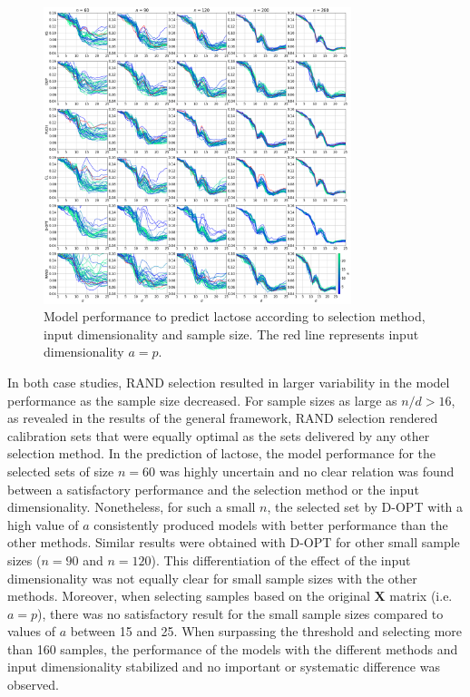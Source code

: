 \documentclass[journal=ancham,manuscript=article]{achemso}
\begin{document}
\begin{figure}[b]
\includegraphics[width=0.8\textwidth]{manuscript/figures/d01_milk_model_performance.png}
\centering
\caption{Model performance to predict lactose according to selection method, input dimensionality and sample size. The red line represents input dimensionality $a=p$.}
\label{fig_d01_milk_model_performance}
\end{figure}

In both case studies, RAND selection resulted in larger variability in the model performance as the sample size decreased. For sample sizes as large as $n/d>16$, as revealed in the results of the general framework, RAND selection rendered calibration sets that were equally optimal as the sets delivered by any other selection method. In the prediction of lactose, the model performance for the selected sets of size $n=60$ was highly uncertain and no clear relation was found between a satisfactory performance and the selection method or the input dimensionality. Nonetheless, for such a small $n$, the selected set by D-OPT with a high value of $a$ consistently produced models with better performance than the other methods. Similar results were obtained with D-OPT for other small sample sizes ($n=90$ and $n=120$). This differentiation of the effect of the input dimensionality was not equally clear for small sample sizes with the other methods. Moreover, when selecting samples based on the original $\mathbf{X}$ matrix (i.e. $a=p$), there was no satisfactory result for the small sample sizes compared to values of $a$ between 15 and 25. When surpassing the threshold and selecting more than 160 samples, the performance of the models with the different methods and input dimensionality stabilized and no important or systematic difference was observed.
\end{document}
